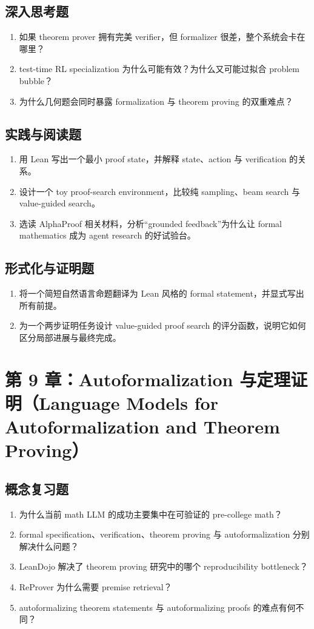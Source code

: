 \subsection*{深入思考题}
\begin{enumerate}
\item 如果 theorem prover 拥有完美 verifier，但 formalizer 很差，整个系统会卡在哪里？
\item test-time RL specialization 为什么可能有效？为什么又可能过拟合 problem bubble？
\item 为什么几何题会同时暴露 formalization 与 theorem proving 的双重难点？
\end{enumerate}

\subsection*{实践与阅读题}
\begin{enumerate}
\item 用 Lean 写出一个最小 proof state，并解释 state、action 与 verification 的关系。
\item 设计一个 toy proof-search environment，比较纯 sampling、beam search 与 value-guided search。
\item 选读 AlphaProof 相关材料，分析“grounded feedback”为什么让 formal mathematics 成为 agent research 的好试验台。
\end{enumerate}

\subsection*{形式化与证明题}
\begin{enumerate}
\item 将一个简短自然语言命题翻译为 Lean 风格的 formal statement，并显式写出所有前提。
\item 为一个两步证明任务设计 value-guided proof search 的评分函数，说明它如何区分局部进展与最终完成。
\end{enumerate}

\section{第 9 章：Autoformalization 与定理证明（Language Models for Autoformalization and Theorem Proving）}

\subsection*{概念复习题}
\begin{enumerate}
\item 为什么当前 math LLM 的成功主要集中在可验证的 pre-college math？
\item formal specification、verification、theorem proving 与 autoformalization 分别解决什么问题？
\item LeanDojo 解决了 theorem proving 研究中的哪个 reproducibility bottleneck？
\item ReProver 为什么需要 premise retrieval？
\item autoformalizing theorem statements 与 autoformalizing proofs 的难点有何不同？
\end{enumerate}

